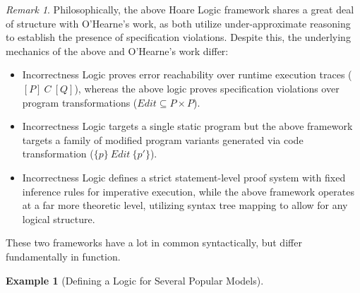 \documentclass[11pt]{amsart}
\theoremstyle{definition}
\newtheorem{example}{Example}
\theoremstyle{remark}
\newtheorem*{remark}{Remark}
\newcommand{\Edit}{\mathit{Edit}}
\begin{document}
\begin{remark}
Philosophically, the above Hoare Logic framework shares a great deal of structure with O'Hearne's work,
as both utilize under-approximate reasoning to establish the presence of specification violations. Despite
this, the underlying mechanics of the above and O'Hearne's work differ:
\begin{itemize}
  \item Incorrectness Logic proves error reachability over runtime execution traces ($[P]\ C\ [Q]$), whereas
  the above logic proves specification violations over program transformations ($\Edit \subseteq P \times P$).
  \item Incorrectness Logic targets a single static program but the above framework targets a family of
  modified program variants generated via code transformation ($\{p\}\ \Edit\ \{p'\}$).
  \item Incorrectness Logic defines a strict statement-level proof system with fixed inference rules for
  imperative execution, while the above framework operates at a far more theoretic level, utilizing
  syntax tree mapping to allow for any logical structure.
\end{itemize}
These two frameworks have a lot in common syntactically, but differ fundamentally in function.
\end{remark}

\begin{example}[Defining a Logic for Several Popular Models]
\label{ex:logics}
\end{example}
\end{document}
